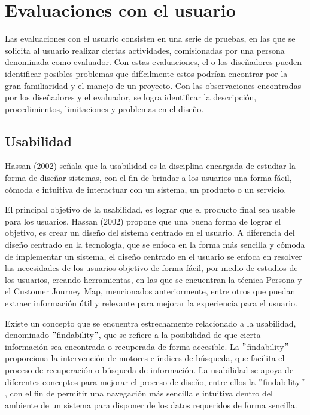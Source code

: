 \section{Evaluaciones con el usuario}
\label{EvaluacionesCap3}

Las evaluaciones con el usuario consisten en una serie de pruebas, en las que se solicita al usuario realizar ciertas actividades, comisionadas por una persona denominada como evaluador. Con estas evaluaciones, el o los diseñadores pueden identificar posibles problemas que difícilmente estos podrían encontrar por la gran familiaridad y el manejo de un proyecto. Con las observaciones encontradas por los diseñadores y el evaluador, se logra identificar la descripción, procedimientos, limitaciones y problemas en el diseño.


\subsection{Usabilidad}
\label{UsabilidadCap3}

Hassan (2002) señala que la usabilidad es la disciplina encargada de estudiar la forma de diseñar sistemas, con el fin de brindar a los usuarios una forma fácil, cómoda e intuitiva de interactuar con un sistema, un producto o un servicio.

El principal objetivo de la usabilidad, es lograr que el producto final sea usable para los usuarios. Hassan (2002) propone que una buena forma de lograr el objetivo, es crear un diseño del sistema centrado en el usuario. A diferencia del diseño centrado en la tecnología, que se enfoca en la forma más sencilla y cómoda de implementar un sistema, el diseño centrado en el usuario se enfoca en resolver las necesidades de los usuarios objetivo de forma fácil, por medio de estudios de los usuarios, creando herramientas, en las que se encuentran la técnica Persona y el Customer Journey Map, mencionados anteriormente, entre otros que puedan extraer información útil y relevante para mejorar la experiencia para el usuario.

Existe un concepto que se encuentra estrechamente relacionado a la usabilidad, denominado $"$findability$"$, que se refiere a la posibilidad de que cierta información sea encontrada o recuperada de forma accesible. La $"$findability$"$ proporciona la intervención de motores e índices de búsqueda, que facilita el proceso de recuperación o búsqueda de información. La usabilidad se apoya de diferentes conceptos para mejorar el proceso de diseño, entre ellos la $"$findability$"$, con el fin de permitir una navegación más sencilla e intuitiva dentro del ambiente de un sistema para disponer de los datos requeridos de forma sencilla.

